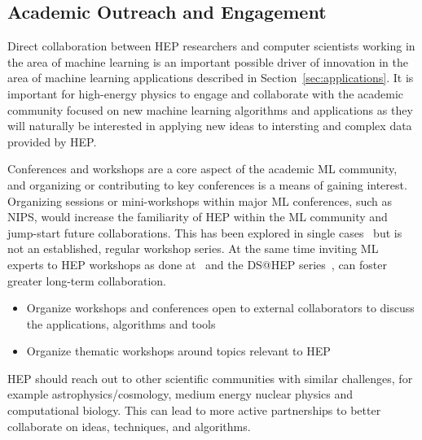 \subsection{Academic Outreach and Engagement}

Direct collaboration between HEP researchers and computer scientists working in the area of machine learning is an important possible driver of innovation in the area of machine learning applications described in Section~\ref{sec:applications}. It is important for high-energy physics to engage and collaborate with the academic community focused on new machine learning algorithms and applications as they will naturally be interested in applying new ideas to intersting and complex data provided by HEP.

Conferences and workshops are a core aspect of the academic ML community, and organizing or contributing to key conferences is a means of gaining interest. Organizing sessions or mini-workshops within major ML conferences, such as NIPS, would increase the familiarity of HEP within the ML community and jump-start future collaborations. This has been explored in single cases~\cite{NIPS:2015:ALEPH} but is not an established, regular workshop series. At the same time inviting ML experts to HEP workshops as done at~\cite{FlavourDataMining} and the DS@HEP series~\cite{DSatHEP2015, DSatHEP2016, DSatHEP2017}, can foster greater long-term collaboration.

\begin{itemize}
 \item Organize workshops and conferences open to external collaborators to discuss the applications, algorithms and tools
 \item Organize thematic workshops around topics relevant to HEP
\end{itemize}

HEP should reach out to other scientific communities with similar challenges, for example astrophysics/cosmology, medium energy nuclear physics and computational biology. This can lead to more active partnerships to better collaborate on ideas, techniques, and algorithms.



